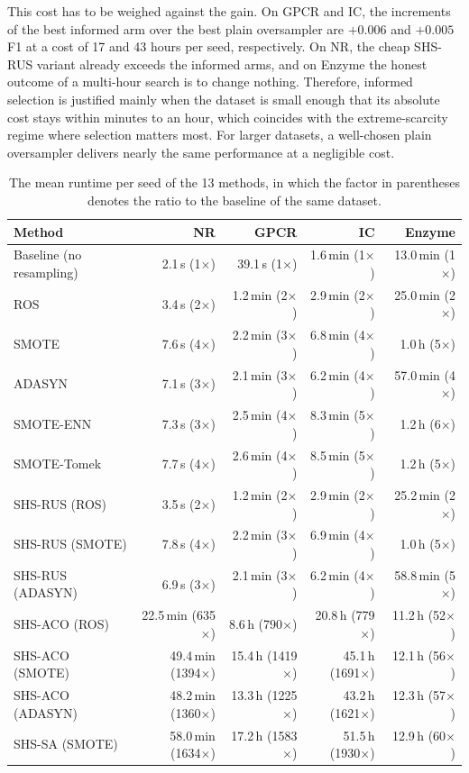 \documentclass[pdflatex,sn-basic]{sn-jnl}
\begin{document}
This cost has to be weighed against the gain. On GPCR and IC, the
increments of the best informed arm over the best plain oversampler are
$+0.006$ and $+0.005$ F1 at a cost of 17 and 43 hours per seed, respectively. On NR,
the cheap SHS-RUS variant already exceeds the informed arms, and on
Enzyme the honest outcome of a multi-hour search is to change nothing.
Therefore, informed selection is justified mainly when the dataset is
small enough that its absolute cost stays within minutes to an hour,
which coincides with the extreme-scarcity regime where selection matters
most. For larger datasets, a well-chosen plain oversampler delivers
nearly the same performance at a negligible cost.

\begin{table}[htbp]
\centering
\caption{The mean runtime per seed of the 13 methods, in which the
factor in parentheses denotes the ratio to the baseline of the same
dataset.}
\label{tab:runtime}
\footnotesize
\begin{tabular}{lrrrr}
\toprule
Method & NR & GPCR & IC & Enzyme \\
\midrule
Baseline (no resampling) & 2.1\,s (1$\times$) & 39.1\,s (1$\times$) & 1.6\,min (1$\times$) & 13.0\,min (1$\times$) \\
ROS & 3.4\,s (2$\times$) & 1.2\,min (2$\times$) & 2.9\,min (2$\times$) & 25.0\,min (2$\times$) \\
SMOTE & 7.6\,s (4$\times$) & 2.2\,min (3$\times$) & 6.8\,min (4$\times$) & 1.0\,h (5$\times$) \\
ADASYN & 7.1\,s (3$\times$) & 2.1\,min (3$\times$) & 6.2\,min (4$\times$) & 57.0\,min (4$\times$) \\
SMOTE-ENN & 7.3\,s (3$\times$) & 2.5\,min (4$\times$) & 8.3\,min (5$\times$) & 1.2\,h (6$\times$) \\
SMOTE-Tomek & 7.7\,s (4$\times$) & 2.6\,min (4$\times$) & 8.5\,min (5$\times$) & 1.2\,h (5$\times$) \\
SHS-RUS (ROS) & 3.5\,s (2$\times$) & 1.2\,min (2$\times$) & 2.9\,min (2$\times$) & 25.2\,min (2$\times$) \\
SHS-RUS (SMOTE) & 7.8\,s (4$\times$) & 2.2\,min (3$\times$) & 6.9\,min (4$\times$) & 1.0\,h (5$\times$) \\
SHS-RUS (ADASYN) & 6.9\,s (3$\times$) & 2.1\,min (3$\times$) & 6.2\,min (4$\times$) & 58.8\,min (5$\times$) \\
SHS-ACO (ROS) & 22.5\,min (635$\times$) & 8.6\,h (790$\times$) & 20.8\,h (779$\times$) & 11.2\,h (52$\times$) \\
SHS-ACO (SMOTE) & 49.4\,min (1394$\times$) & 15.4\,h (1419$\times$) & 45.1\,h (1691$\times$) & 12.1\,h (56$\times$) \\
SHS-ACO (ADASYN) & 48.2\,min (1360$\times$) & 13.3\,h (1225$\times$) & 43.2\,h (1621$\times$) & 12.3\,h (57$\times$) \\
SHS-SA (SMOTE) & 58.0\,min (1634$\times$) & 17.2\,h (1583$\times$) & 51.5\,h (1930$\times$) & 12.9\,h (60$\times$) \\
\bottomrule
\end{tabular}
\end{table}
\end{document}
